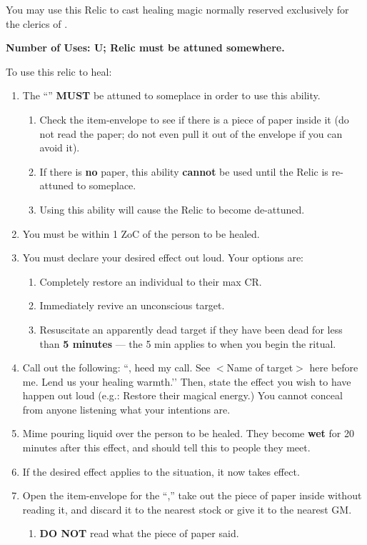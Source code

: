 \documentclass[green]{GL2020}
\begin{document}
\name{\gHealingRelic{}}

You may use this Relic to cast healing magic normally reserved exclusively for the clerics of \cFarmGod{}. 

\textbf{Number of Uses: U; Relic must be attuned somewhere.}

To use this relic to heal:
\begin{enumerate}
  \item The ``\iPitcher{}'' \textbf{MUST} be attuned to someplace in order to use this ability.
  \begin{enumerate}
    \item Check the item-envelope to see if there is a piece of paper inside it (do not read the paper; do not even pull it out of the envelope if you can avoid it).
    \item If there is \textbf{no} paper, this ability \textbf{cannot} be used until the Relic is re-attuned to someplace.
    \item Using this ability will cause the Relic to become de-attuned.
  \end{enumerate}
  \item You must be within 1 ZoC of the person to be healed.
  \item You must declare your desired effect out loud. Your options are:
  \begin{enumerate}
    \item Completely restore an individual to their max CR.
    \item Immediately revive an unconscious target.
    \item Resuscitate an apparently dead target if they have been dead for less than \textbf{5 minutes} — the 5 min applies to when you begin the ritual.
  \end{enumerate}
  \item Call out the following: ``\cFarmGod{}, heed my call. See $<$Name of target$>$ here before me. Lend us your healing warmth.’’ Then, state the effect you wish to have happen out loud (e.g.: Restore their magical energy.) You cannot conceal from anyone listening what your intentions are.
  \item Mime pouring liquid over the person to be healed. They become \textbf{wet} for 20 minutes after this effect, and should tell this to people they meet.
  \item If the desired effect applies to the situation, it now takes effect.
  \item Open the item-envelope for the ``\iPitcher{},'' take out the piece of paper inside without reading it, and discard it to the nearest stock or give it to the nearest GM.
  \begin{enumerate}
    \item \textbf{DO NOT} read what the piece of paper said.
  \end{enumerate}
\end{enumerate}
\end{document}
